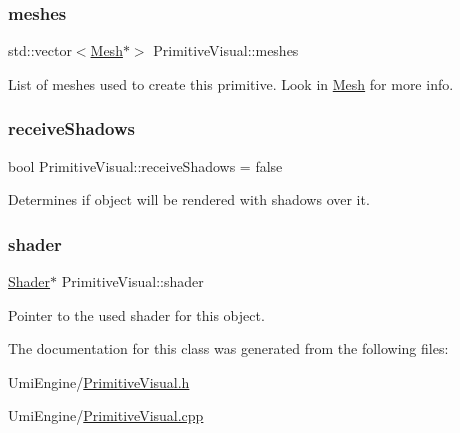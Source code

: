 \mbox{\label{class_primitive_visual_a12252f7d680eb47471a13d121c0898d5}} 
\subsubsection{\texorpdfstring{meshes}{meshes}}
{\footnotesize\ttfamily std\+::vector$<$\mbox{\hyperlink{class_mesh}{Mesh}}$\ast$$>$ Primitive\+Visual\+::meshes}



List of meshes used to create this primitive. Look in \mbox{\hyperlink{class_mesh}{Mesh}} for more info. 

\mbox{\label{class_primitive_visual_ab3f6291a1a2914f0403ae118f8d9d8e5}} 
\subsubsection{\texorpdfstring{receiveShadows}{receiveShadows}}
{\footnotesize\ttfamily bool Primitive\+Visual\+::receive\+Shadows = false}



Determines if object will be rendered with shadows over it. 

\mbox{\label{class_primitive_visual_a463e83ee34d0727a19cf417f74ea67e7}} 
\subsubsection{\texorpdfstring{shader}{shader}}
{\footnotesize\ttfamily \mbox{\hyperlink{class_shader}{Shader}}$\ast$ Primitive\+Visual\+::shader}



Pointer to the used shader for this object. 



The documentation for this class was generated from the following files\+:\begin{DoxyCompactItemize}
\item 
Umi\+Engine/\mbox{\hyperlink{_primitive_visual_8h}{Primitive\+Visual.\+h}}\item 
Umi\+Engine/\mbox{\hyperlink{_primitive_visual_8cpp}{Primitive\+Visual.\+cpp}}\end{DoxyCompactItemize}
